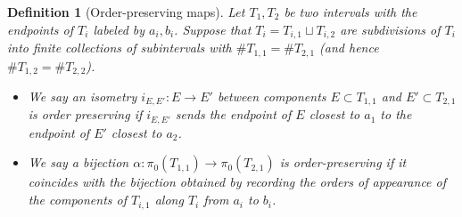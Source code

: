 \documentclass[10pt,a4paper]{amsart}
\newtheorem{definition}{Definition}
\begin{document}
\begin{definition}[Order-preserving maps]\label{defn:order preserving}
Let $T_1, T_2$ be two intervals with the endpoints of $T_i$ labeled by $a_i,b_i$.  Suppose that $T_i = T_{i,1} \sqcup T_{i,2}$ are subdivisions of $T_i$ into finite collections of subintervals with $\# T_{1,1} = \#T_{2,1}$ (and hence $\#T_{1,2} = \#T_{2,2}$).

\begin{itemize}
\item We say an isometry $i_{E,E'}:E \to E'$ between components $E \subset T_{1,1}$ and $E' \subset T_{2,1}$ is \emph{order preserving} if $i_{E,E'}$ sends the endpoint of $E$ closest to $a_1$ to the endpoint of $E'$ closest to $a_2$.
\item We say a bijection $\alpha:\pi_0(T_{1,1}) \to \pi_0(T_{2,1})$ is \emph{order-preserving} if it coincides with the bijection obtained by recording the orders of appearance of the components of $T_{i,1}$ along $T_i$ from $a_i$ to $b_i$.
\end{itemize}
\end{definition}
\end{document}
